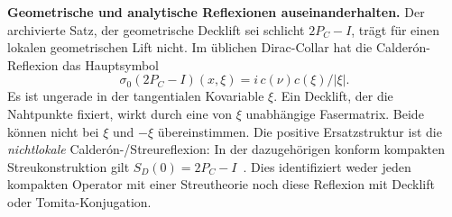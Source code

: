\textbf{Geometrische und analytische Reflexionen auseinanderhalten.}
Der archivierte Satz, der geometrische Decklift sei schlicht $2P_C-I$, trägt für einen lokalen geometrischen Lift nicht. Im üblichen Dirac-Collar hat die Calderón-Reflexion das Hauptsymbol
\begin{equation}
\sigma_0(2P_C-I)(x,\xi)=i\,c(\nu)c(\xi)/|\xi|.
\end{equation}
Es ist ungerade in der tangentialen Kovariable $\xi$. Ein Decklift, der die Nahtpunkte fixiert, wirkt durch eine von $\xi$ unabhängige Fasermatrix. Beide können nicht bei $\xi$ und $-\xi$ übereinstimmen. Die positive Ersatzstruktur ist die \emph{nichtlokale} Calderón-/Streureflexion: In der dazugehörigen konform kompakten Streukonstruktion gilt $S_D(0)=2P_C-I$~\cite{calderonscattering}. Dies identifiziert weder jeden kompakten Operator mit einer Streutheorie noch diese Reflexion mit Decklift oder Tomita-Konjugation.


